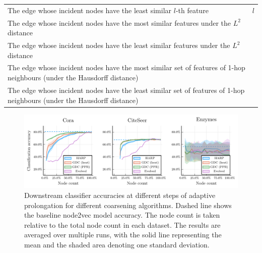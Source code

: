\begin{table}
\begin{center}
\begin{minipage}{\textwidth}
\begin{tabularx}{\textwidth}{Xr}
        The edge whose incident nodes have the least similar \( l \)-th feature                                                 & \( l \)                \\
        The edge whose incident nodes have the most similar features under the \( L^2 \) distance                               &                        \\
        The edge whose incident nodes have the least similar features under the \( L^2 \) distance                              &                        \\
        The edge whose incident nodes have the most similar set of features of 1-hop neighbours (under the Hausdorff distance)  &                        \\
        The edge whose incident nodes have the least similar set of features of 1-hop neighbours (under the Hausdorff distance) &                        \\
        \bottomrule
      \end{tabularx}
    \end{minipage}
  \end{center}
\end{table}

\begin{figure}
  \centering
  \includegraphics[width=\linewidth]{images/coarsening-algorithms/coarsening-algorithms.pdf}
  \caption{Downstream classifier accuracies at different steps of adaptive prolongation for different coarsening algorithms. Dashed line shows the baseline node2vec model accuracy. The node count is taken relative to the total node count in each dataset. The results are averaged over multiple runs, with the solid line representing the mean and the shaded area denoting one standard deviation.}
  \label{fig:coarsening-algorithms}
\end{figure}

